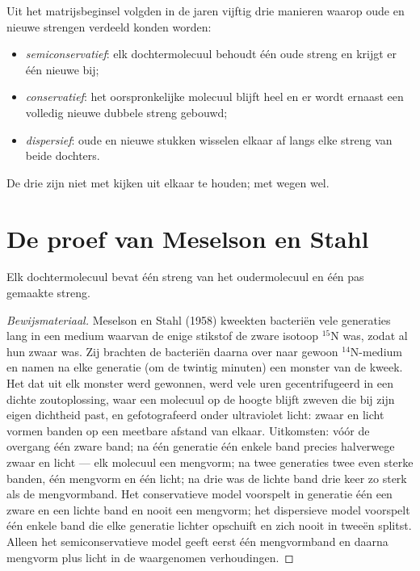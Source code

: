 \begin{example}\label{ex:g11:dna-replication:models}
Uit het matrijsbeginsel volgden in de jaren vijftig drie manieren waarop
oude en nieuwe strengen verdeeld konden worden:
\begin{itemize}
  \item \emph{semiconservatief}: elk dochtermolecuul behoudt één oude
        streng en krijgt er één nieuwe bij;
  \item \emph{conservatief}: het oorspronkelijke molecuul blijft heel en
        er wordt ernaast een volledig nieuwe dubbele streng gebouwd;
  \item \emph{dispersief}: oude en nieuwe stukken wisselen elkaar af
        langs elke streng van beide dochters.
\end{itemize}
De drie zijn niet met kijken uit elkaar te houden; met wegen wel.
\end{example}

\section{De proef van Meselson en Stahl}

\begin{proposition}\label{prop:g11:dna-replication:semiconservative}
Elk dochtermolecuul  bevat één streng van het oudermolecuul en één
pas gemaakte streng.
\end{proposition}
\begin{proof}[Bewijsmateriaal]
Meselson en Stahl (1958) kweekten bacteriën vele generaties lang in een
medium waarvan de enige stikstof de zware isotoop $^{15}$N was, zodat al
hun  zwaar was. Zij brachten de bacteriën daarna over naar gewoon
$^{14}$N-medium en namen na elke generatie (om de twintig minuten) een
monster van de kweek. Het  dat uit elk monster werd gewonnen, werd
vele uren gecentrifugeerd in een dichte zoutoplossing, waar een molecuul
op de hoogte blijft zweven die bij zijn eigen dichtheid past, en
gefotografeerd onder ultraviolet licht: zwaar en licht  vormen banden
op een meetbare afstand van elkaar. Uitkomsten: vóór de overgang één
zware band; na één generatie één enkele band precies halverwege zwaar en
licht --- elk molecuul een mengvorm; na twee generaties twee even sterke
banden, één mengvorm en één licht; na drie was de lichte band drie keer
zo sterk als de mengvormband. Het conservatieve model voorspelt in
generatie één een zware en een lichte band en nooit een mengvorm; het
dispersieve model voorspelt één enkele band die elke generatie lichter
opschuift en zich nooit in tweeën splitst. Alleen het semiconservatieve
model geeft eerst één mengvormband en daarna mengvorm plus licht in de
waargenomen verhoudingen.
\end{proof}

